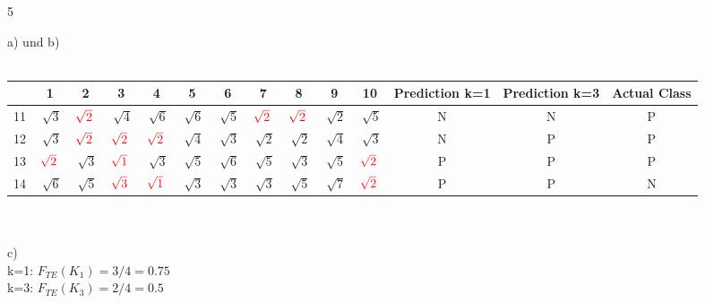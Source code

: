 \documentclass{article}
\begin{document}
\begin{ukon-infie}[29.11.17]{5}
		\begin{exercise}[p=10]{}
		a) und b)\\\\
		\begin{tabular}{|c|c|c|c|c|c|c|c|c|c|c|c|c|c|}
		\hline 
		 & 1 & 2 & 3 & 4 & 5 & 6 & 7 & 8 & 9 & 10 & Prediction k=1 & Prediction k=3 & Actual Class \\ 
		\hline 
		11 & $\sqrt[]{3}$ & $ \color{red} \sqrt[]{2}$ & $\sqrt[]{4}$ & $\sqrt[]{6}$ & $\sqrt[]{6}$ & $\sqrt[]{5}$ & $ \color{red} \sqrt[]{2}$ & $ \color{red} \sqrt[]{2}$ & $\sqrt[]{2}$ & $\sqrt[]{5}$ & N & N & P \\ 
		\hline 
		12 & $\sqrt[]{3}$ & $ \color{red} \sqrt[]{2}$ & $ \color{red} \sqrt[]{2}$ & $ \color{red} \sqrt[]{2}$ & $\sqrt[]{4}$ & $\sqrt[]{3}$ & $\sqrt[]{2}$ & $\sqrt[]{2}$ & $\sqrt[]{4}$ & $\sqrt[]{3}$ & N & P & P \\ 
		\hline 
		13 & $ \color{red} \sqrt[]{2}$ & $\sqrt[]{3}$ & $ \color{red} \sqrt[]{1}$ & $\sqrt[]{3}$ & $\sqrt[]{5}$ & $\sqrt[]{6}$ & $\sqrt[]{5}$ & $\sqrt[]{3}$ & $\sqrt[]{5}$ & $ \color{red} \sqrt[]{2}$ & P & P & P \\ 
		\hline 
		14 & $\sqrt[]{6}$ & $\sqrt[]{5}$ & $ \color{red} \sqrt[]{3}$ & $ \color{red} \sqrt[]{1}$ & $\sqrt[]{3}$ & $\sqrt[]{3}$ & $\sqrt[]{3}$ & $\sqrt[]{5}$ & $\sqrt[]{7}$ & $ \color{red} \sqrt[]{2}$ & P & P & N \\ 
		\hline 
		\end{tabular}\\\\
		c) \\
		k=1: $F_{TE}(K_1) = 3/4 =0.75$\\
		k=3: $F_{TE}(K_3) = 2/4 =0.5$\\
		
		\end{exercise}
		
		\begin{exercise}[p=4]{}
			
		\end{exercise}
		
		


		\begin{exercise}[p=3]{}
		

		\end{exercise}
		
		
\end{ukon-infie}
\end{document}
